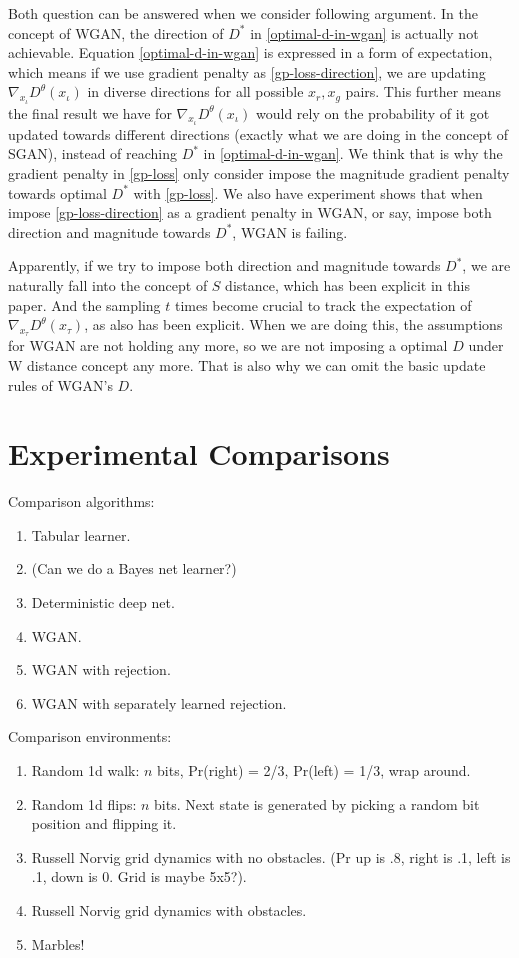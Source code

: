 \documentclass[letterpaper]{article} %
\begin{document}
Both question can be answered when we consider following argument.
In the concept of WGAN, the direction of $D^{\ast}$ in \eqref{optimal-d-in-wgan} is actually not achievable.
Equation \eqref{optimal-d-in-wgan} is expressed in a form of expectation, which means if we use gradient penalty as \eqref{gp-loss-direction}, we are updating $\nabla_{x_{\iota}}D^{\theta}(x_{\iota})$ in diverse directions for all possible $x_r,x_g$ pairs.
This further means the final result we have for $\nabla_{x_{\iota}}D^{\theta}(x_{\iota})$ would rely on the probability of it got updated towards different directions (exactly what we are doing in the concept of SGAN), instead of reaching $D^{\ast}$ in \eqref{optimal-d-in-wgan}.
We think that is why the gradient penalty in \eqref{gp-loss} only consider impose the magnitude gradient penalty towards optimal $D^{\ast}$ with \eqref{gp-loss}.
We also have experiment shows that when impose \eqref{gp-loss-direction} as a gradient penalty in WGAN, or say, impose both direction and magnitude towards $D^{\ast}$, WGAN is failing.

Apparently, if we try to impose both direction and magnitude towards $D^{\ast}$, we are naturally fall into the concept of $S$ distance, which has been explicit in this paper.
And the sampling $t$ times become crucial to track the expectation of $\nabla_{x_{\tau}}D^{\theta}(x_{\tau})$, as also has been explicit.
When we are doing this, the assumptions for WGAN are not holding any more, so we are not imposing a optimal $D$ under W distance concept any more.
That is also why we can omit the basic update rules of WGAN's $D$.

\section{Experimental Comparisons}

Comparison algorithms:
\begin{enumerate}
\item Tabular learner.
\item (Can we do a Bayes net learner?)
\item Deterministic deep net.
\item WGAN.
\item WGAN with rejection.
\item WGAN with separately learned rejection.
\end{enumerate}

Comparison environments:
\begin{enumerate}
\item Random 1d walk: $n$ bits, Pr(right) = 2/3, Pr(left) = 1/3, wrap around.
\item Random 1d flips: $n$ bits. Next state is generated by picking a random bit position and flipping it.
\item Russell Norvig grid dynamics with no obstacles. (Pr up is .8, right is .1, left is .1, down is 0. Grid is maybe 5x5?).
\item Russell Norvig grid dynamics with obstacles.
\item Marbles!
\end{enumerate}
\end{document}
